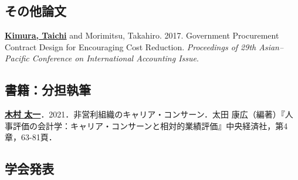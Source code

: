 \documentclass[letterpaper,uplatex]{article}
\renewenvironment{itemize}{
  \begin{list}{}{
    \setlength{\leftmargin}{1.5em}
  }
}{
  \end{list}
}
\begin{document}
\subsection*{その他論文}

\begin{itemize}
    \item \underline{\textbf{Kimura, Taichi}} and Morimitsu, Takahiro. 2017. Government Procurement Contract Design for Encouraging Cost Reduction. \textit{Proceedings of 29th Asian--Pacific Conference on International Accounting Issue}.
\end{itemize}

\subsection*{書籍：分担執筆}

\begin{itemize}
	\item \underline{\textbf{木村 太一}}．2021．非営利組織のキャリア・コンサーン．太田 康広（編著）『人事評価の会計学：キャリア・コンサーンと相対的業績評価』中央経済社，第4章，63-81頁．
\end{itemize}

\subsection*{学会発表}
\end{document}
